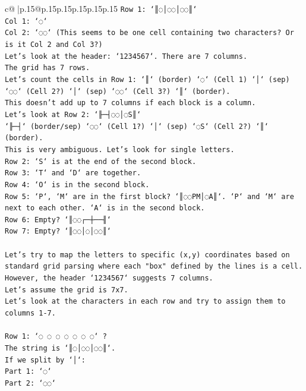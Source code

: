 \documentclass{article}
\begin{document}
{\begin{supertabular}{c@{$\;$}|p{.15\linewidth}@{}p{.15\linewidth}p{.15\linewidth}p{.15\linewidth}p{.15\linewidth}p{.15\linewidth}}
{{{\texttt{Row 1: `║◌│◌◌│◌◌║`} \\
\texttt{Col 1: `◌`} \\
\texttt{Col 2: `◌◌` (This seems to be one cell containing two characters? Or is it Col 2 and Col 3?)} \\
\texttt{Let's look at the header: `1234567`. There are 7 columns.} \\
\texttt{The grid has 7 rows.} \\
\texttt{Let's count the cells in Row 1: `║` (border) `◌` (Cell 1) `│` (sep) `◌◌` (Cell 2?) `│` (sep) `◌◌` (Cell 3?) `║` (border).} \\
\texttt{This doesn't add up to 7 columns if each block is a column.} \\
\texttt{Let's look at Row 2: `╟─┤◌◌│◌S║`} \\
\texttt{`╟─┤` (border/sep) `◌◌` (Cell 1?) `│` (sep) `◌S` (Cell 2?) `║` (border).} \\
\texttt{This is very ambiguous. Let's look for single letters.} \\
\texttt{Row 2: `S` is at the end of the second block.} \\
\texttt{Row 3: `T` and `D` are together.} \\
\texttt{Row 4: `O` is in the second block.} \\
\texttt{Row 5: `P`, `M` are in the first block? `║◌◌PM│◌A║`. `P` and `M` are next to each other. `A` is in the second block.} \\
\texttt{Row 6: Empty? `║◌◌┌─┼──╢`} \\
\texttt{Row 7: Empty? `║◌◌│◌│◌◌║`} \\
\\ 
\texttt{Let's try to map the letters to specific (x,y) coordinates based on standard grid parsing where each "box" defined by the lines is a cell.} \\
\texttt{However, the header `1234567` suggests 7 columns.} \\
\texttt{Let's assume the grid is 7x7.} \\
\texttt{Let's look at the characters in each row and try to assign them to columns 1{-}7.} \\
\\ 
\texttt{Row 1: `◌ ◌ ◌ ◌ ◌ ◌ ◌` ?} \\
\texttt{The string is `║◌│◌◌│◌◌║`.} \\
\texttt{If we split by `│`:} \\
\texttt{Part 1: `◌`} \\
\texttt{Part 2: `◌◌`} \\
}}}
\end{supertabular}}
\end{document}
